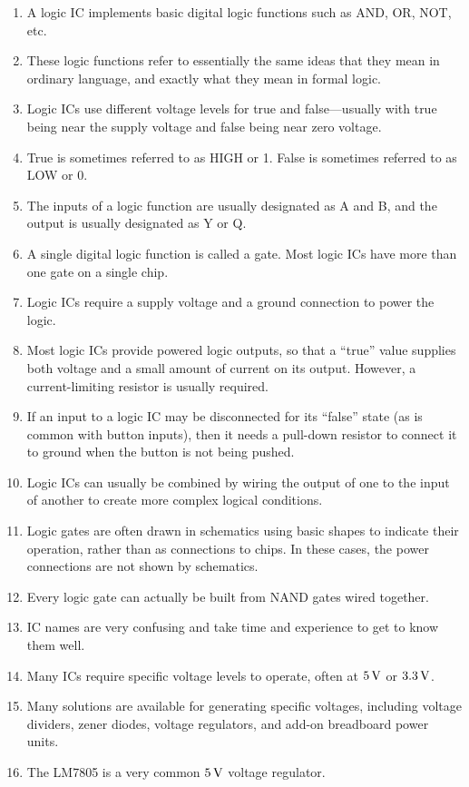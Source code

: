 \begin{enumerate}
\item A logic IC implements basic digital logic functions such as AND, OR, NOT, etc.
\item These logic functions refer to essentially the same ideas that they mean in ordinary language, and exactly what they mean in formal logic.
\item Logic ICs use different voltage levels for true and false---usually with true being near the supply voltage and false being near zero voltage.
\item True is sometimes referred to as HIGH or 1.  False is sometimes referred to as LOW or 0.
\item The inputs of a logic function are usually designated as A and B, and the output is usually designated as Y or Q.
\item A single digital logic function is called a gate.  Most logic ICs have more than one gate on a single chip.
\item Logic ICs require a supply voltage and a ground connection to power the logic.
\item Most logic ICs provide powered logic outputs, so that a ``true'' value supplies both voltage and a small amount of current on its output.  However, a current-limiting resistor is usually required.
\item If an input to a logic IC may be disconnected for its ``false'' state (as is common with button inputs), then it needs a pull-down resistor to connect it to ground when the button is not being pushed.
\item Logic ICs can usually be combined by wiring the output of one to the input of another to create more complex logical conditions.
\item Logic gates are often drawn in schematics using basic shapes to indicate their operation, rather than as connections to chips.  In these cases, the power connections are not shown by schematics.
\item Every logic gate can actually be built from NAND gates wired together.
\item IC names are very confusing and take time and experience to get to know them well.
\item Many ICs require specific voltage levels to operate, often at $5\,\si{\volt}$ or $3.3\,\si{\volt}$.
\item Many solutions are available for generating specific voltages, including voltage dividers, zener diodes, voltage regulators, and add-on breadboard power units.
\item The LM7805 is a very common $5\,\si{\volt}$ voltage regulator.
\end{enumerate}

